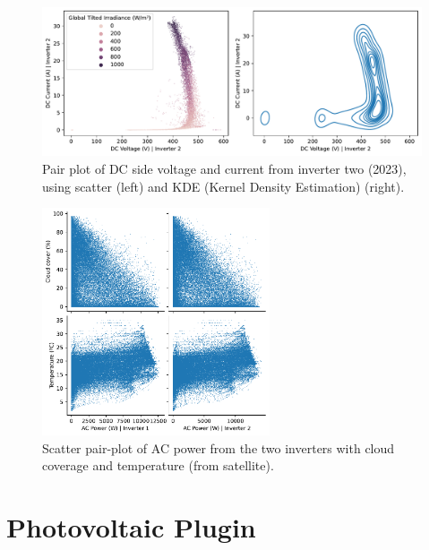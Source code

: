 \begin{figure}[h]
    \centering
    \includegraphics[width=\textwidth]{figures/appendix/b_analysis/07_voltage_current_pairplot_test_2.pdf}
    \caption{Pair plot of DC side voltage and current from inverter two (2023), using scatter (left) and KDE (Kernel Density Estimation) (right).}
    \label{fig:eda_voltage_current_test_2}
\end{figure}

\begin{figure}[h]
    \centering
    \includegraphics[width=0.6\textwidth]{figures/appendix/b_analysis/12_power_meteo_pairplot_kb.pdf}
    \caption{Scatter pair-plot of AC power from the two inverters with cloud coverage and temperature (from satellite).}
    \label{fig:eda_irrelevant_meteo}
\end{figure}

\section{Photovoltaic Plugin}

